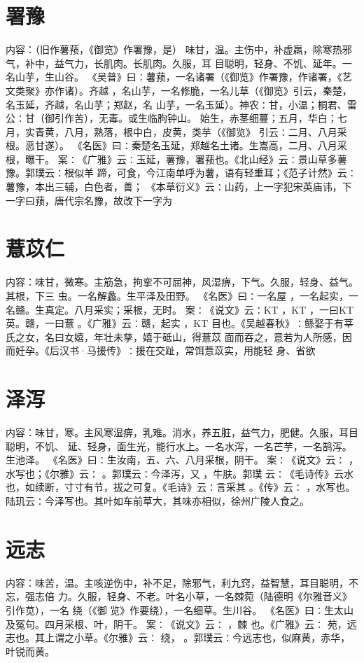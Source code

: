 \documentclass[12pt,UTF8]{ctexbook}
\begin{document}
\section{署豫}
内容：（旧作薯蓣，《御览》作署豫，是） 
味甘，温。主伤中，补虚羸，除寒热邪气，补中，益气力，长肌肉。长肌肉。久服，耳 
目聪明，轻身、不饥、延年。一名山芋，生山谷。 
《吴普》曰∶薯蓣，一名诸署（《御览》作署豫，作诸署，《艺文类聚》亦作诸）。齐越 
，名山芋，一名修脆，一名儿草（《御览》引云，秦楚，名玉延，齐越，名山芋；郑赵，名 
山芋，一名玉延）。神农∶甘，小温；桐君、雷公∶甘（御引作苦），无毒。或生临朐钟山。 
始生，赤茎细蔓；五月，华白；七月，实青黄，八月，熟落，根中白，皮黄，类芋（《御览》 
引云∶二月、八月采根。恶甘遂）。 
《名医》曰∶秦楚名玉延，郑越名土诸。生嵩高，二月、八月采根，曝干。 
案∶《广雅》云∶玉延，薯豫，署蓣也。《北山经》云∶景山草多薯豫。郭璞云∶根似羊 
蹄，可食，今江南单呼为薯，语有轻重耳；《范子计然》云∶薯豫，本出三辅，白色者，善； 
《本草衍义》云∶山药，上一字犯宋英庙讳，下一字曰蓣，唐代宗名豫，故改下一字为 


\section{薏苡仁}
内容：味甘，微寒。主筋急，拘挛不可屈神，风湿痹，下气。久服，轻身、益气。其根，下三 
虫。一名解蠡。生平泽及田野。 
《名医》曰∶一名屋 ，一名起实，一名赣。生真定。八月采实；采根，无时。 
案∶《说文》云∶KT ，KT ，一曰KT 英。赣，一曰薏 。《广雅》云∶赣，起实 
，KT 目也。《吴越春秋》∶鲧娶于有莘氏之女，名曰女嬉，年壮未孳，嬉于砥山，得薏苡 
面而吞之，意若为人所感，因而妊孕。《后汉书·马援传》∶援在交趾，常饵薏苡实，用能轻 
身、省欲 


\section{泽泻}
内容：味甘，寒。主风寒湿痹，乳难。消水，养五脏，益气力，肥健。久服，耳目聪明，不饥、 
延、轻身，面生光，能行水上。一名水泻，一名芒芋，一名鹄泻。生池泽。 
《名医》曰∶生汝南，五、六、八月采根，阴干。 
案∶《说文》云∶ ，水写也；《尔雅》云∶ 。郭璞云∶今泽泻，又 ，牛肤。郭璞 
云∶《毛诗传》云水 也，如续断，寸寸有节，拔之可复。《毛诗》云∶言采其 。《传》云∶ 
，水写也。陆玑云∶今泽写也。其叶如车前草大，其味亦相似，徐州广陵人食之。 


\section{远志}
内容：味苦，温。主咳逆伤中，补不足，除邪气，利九窍，益智慧，耳目聪明，不忘，强志倍 
力。久服，轻身、不老。叶名小草，一名棘菀（陆德明《尔雅音义》引作苋），一名 绕（《御 
览》作要绕），一名细草。生川谷。 
《名医》曰∶生太山及冤句。四月采根、叶，阴干。 
案∶《说文》云∶ ，棘 也。《广雅》云∶ 苑，远志也。其上谓之小草。《尔雅》云∶ 
绕， 。郭璞云∶今远志也，似麻黄，赤华，叶锐而黄。 
\end{document}

